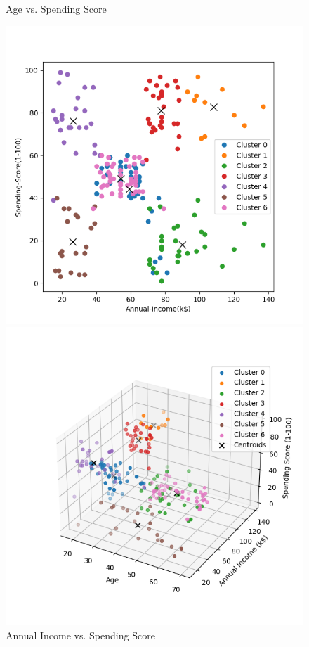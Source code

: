 \documentclass[8pt]{article}
\begin{document}
\begin{figure}[H]
\begin{minipage}{0.32\textwidth}
        \caption{Age vs. Spending Score}
        \label{fig: Age vs. Spending Score k7 rand14}
    \end{minipage}
    \hfill
    \begin{minipage}{0.32\textwidth}
        \centering
        \includegraphics[width=\textwidth]{./Prob4/out/task1_rand14/images/cluster_result_k7_1_2.png}
        \caption{Annual Income vs. Spending Score}
        \label{fig: Annual Income vs. Spending Score k7 rand14}
    \end{minipage}
    \hfill
    \begin{minipage}{0.32\textwidth}
        \centering
        \includegraphics[width=\textwidth]{./Prob4/out/task1_rand14/images/cluster_result_k7_3d.png}

\end{minipage}
\end{figure}
\end{document}
